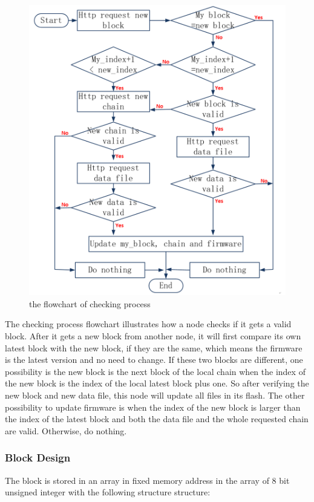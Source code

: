 \documentclass{article}
\begin{document}
        \begin{figure}[h!]
          \centering
          \includegraphics[scale=0.2]{flowchartChecking.jpg}
          \caption{the flowchart of checking process}
          \label{fig:flowchartChecking}
        \end{figure}

        The checking process flowchart illustrates how a node checks if it gets a valid block. After it gets a new block from another node, it will first compare its own latest block with the new block, if they are the same, which means the firmware is the latest version and no need to change. If these two blocks are different, one possibility is the new block is the next block of the local chain when the index of the new block is the index of the local latest block plus one. So after verifying the new block and new data file, this node will update all files in its flash. The other possibility to update firmware is when the index of the new block is larger than the index of the latest block and both the data file and the whole requested chain are valid. Otherwise, do nothing.

        \subsubsection{Block Design}
        The block is stored in an array in fixed memory address in the array of 8 bit unsigned integer with the following structure structure:
\end{document}
